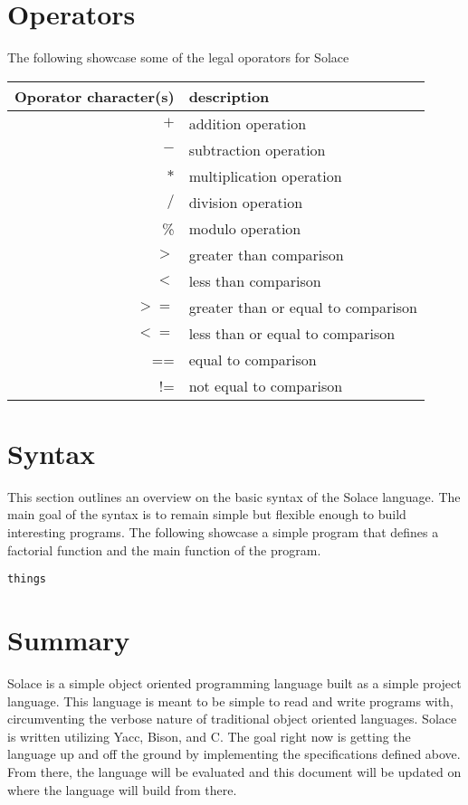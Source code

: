 \documentclass{article}
\begin{document}
\section{Operators}
The following showcase some of the legal oporators for Solace

\begin{tabular}{r|l}
Oporator character(s) & description \\
\hline
\hline
$+$ & addition operation \\
$-$ & subtraction operation \\
$*$ & multiplication operation \\
$/$ & division operation \\
\% & modulo operation \\
$>$ & greater than comparison \\
$<$ & less than comparison \\
$>=$ & greater than or equal to comparison \\
$<=$ & less than or equal to comparison \\
== & equal to comparison \\
!= & not equal to comparison \\
\hline
\end{tabular}


\section{Syntax}
This section outlines an overview on the basic syntax of the Solace language. The main goal of the syntax is to remain
simple but flexible enough to build interesting programs. The following showcase a simple program that defines a
factorial function and the main function of the program.

\begin{verbatim}
things

\end{verbatim}


\section{Summary}
Solace is a simple object oriented programming language built as a simple project language.
This language is meant to be simple to read and write programs with, circumventing the verbose
nature of traditional object oriented languages. Solace is written utilizing Yacc, Bison, and C.
The goal right now is getting the language up and off the ground by implementing the specifications
defined above. From there, the language will be evaluated and this document will be updated on
where the language will build from there.
\end{document}
